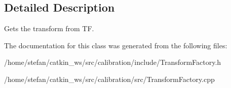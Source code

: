 \subsection{\-Detailed \-Description}
\-Gets the transform from \-T\-F. 

\-The documentation for this class was generated from the following files\-:\begin{DoxyCompactItemize}
\item 
/home/stefan/catkin\-\_\-ws/src/calibration/include/\-Transform\-Factory.\-h\item 
/home/stefan/catkin\-\_\-ws/src/calibration/src/\-Transform\-Factory.\-cpp\end{DoxyCompactItemize}
